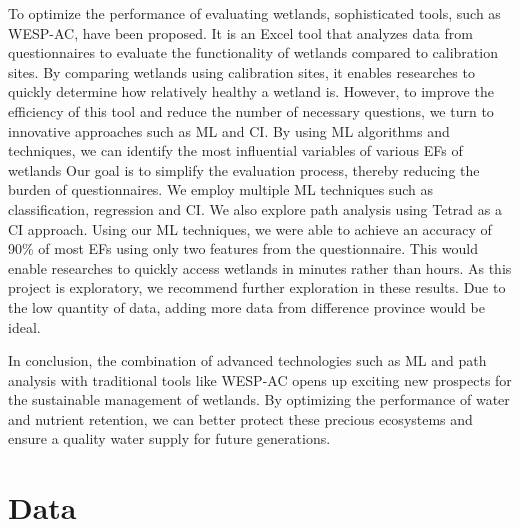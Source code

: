 \documentclass[12pt,letterpaper]{article}
\begin{document}
To optimize the performance of evaluating wetlands, sophisticated tools, such as \acf{WESP-AC}, have been proposed.
It is an Excel tool that analyzes data from questionnaires to evaluate the functionality of wetlands compared to calibration sites.
By comparing wetlands using calibration sites, it enables researches to quickly determine how relatively healthy a wetland is.
However, to improve the efficiency of this tool and reduce the number of necessary questions, we turn to innovative approaches such as \acf{ML} and \acf{CI}.
By using \ac{ML} algorithms and techniques, we can identify the most influential variables of various \ac{EF}s of wetlands
Our goal is to simplify the evaluation process, thereby reducing the burden of questionnaires.
We employ multiple \ac{ML} techniques such as classification, regression and \ac{CI}.
We also explore path analysis using Tetrad as a \ac{CI} approach.
Using our \ac{ML} techniques, we were able to achieve an accuracy of 90\% of most \ac{EF}s using only two features from the questionnaire.
This would enable researches to quickly access wetlands in minutes rather than hours.
As this project is exploratory, we recommend further exploration in these results.
Due to the low quantity of data, adding more data from difference province would be ideal.

In conclusion, the combination of advanced technologies such as \ac{ML} and path analysis with traditional tools like WESP-AC opens up exciting new prospects for the sustainable management of wetlands.
By optimizing the performance of water and nutrient retention, we can better protect these precious ecosystems and ensure a quality water supply for future generations.


\section{Data}\label{sec:data}
\end{document}
